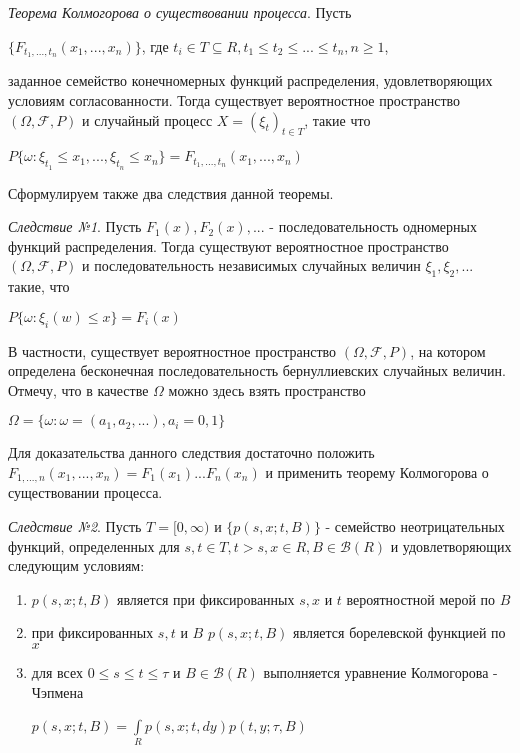 \documentclass[12pt]{article}
\begin{document}
\textit{Теорема Колмогорова о существовании процесса}. Пусть 
\begin{center}
$\lbrace F_{t_{1}, ..., t_{n}}(x_1, ..., x_n) \rbrace $, где $t_i \in T \subseteq R, t_1 \le t_2 \le ... \le t_n, n \geq 1$,
\end{center}
заданное семейство конечномерных функций распределения, удовлетворяющих условиям согласованности. Тогда существует вероятностное пространство $(\Omega , \mathscr{F}, P)$ и случайный процесс $X = (\xi_{t})_{t \in T }$, такие что 
\begin{center}
$P \lbrace \omega : \xi_{t_1} \leq x_1, ..., \xi_{t_n} \leq x_n \rbrace = F_{{t_1}, ..., {t_n}} (x_1, ..., x_n) $
\end{center}

Сформулируем также два следствия данной теоремы.

\textit{Следствие №1}. Пусть $F_1 (x),  F_2 (x), ...$ - последовательность одномерных функций распределения. Тогда существуют вероятностное пространство $(\Omega , \mathscr{F}, P)$ и последовательность независимых случайных величин $\xi_1,  \xi_2, ... $ такие, что
\begin{center}
$P \lbrace \omega : \xi_i (w) \leq x \rbrace = F_i (x)$
\end{center}
В частности, существует вероятностное пространство $(\Omega , \mathscr{F}, P)$, на котором определена бесконечная последовательность бернуллиевских случайных величин. Отмечу, что в качестве $\Omega$ можно здесь взять пространство
\begin{center}
$\Omega = \lbrace \omega : \omega = (a_1, a_2, ...), a_i = 0, 1 \rbrace$
\end{center}

Для доказательства данного следствия достаточно положить $F_{1, ..., n} (x_1, ..., x_n) = F_1 (x_1) ... F_n (x_n)$ и применить теорему Колмогорова о существовании процесса.

\textit{Следствие №2}. Пусть $T = [0, \infty)$ и $\lbrace p(s, x; t, B)\rbrace$ - семейство неотрицательных функций, определенных для $s, t \in T, t > s, x \in R, B \in \mathscr{B}(R)$ и удовлетворяющих следующим условиям:
\begin{enumerate}
\item $p(s, x; t, B)$ является при фиксированных $s, x$ и $t$ вероятностной мерой по $B$
\item при фиксированных $s, t$ и $B$  $p(s, x; t, B)$ является борелевской функцией по $x$
\item для всех $0 \leq s \le t \le \tau$ и $B \in \mathscr{B}(R)$ выполняется уравнение Колмогорова - Чэпмена
\begin{center}
$p(s, x; t, B) = \int\limits_{R}^{ } p(s, x; t, dy)p(t, y; \tau, B)$
\end{center}
\end{enumerate}
\end{document}

